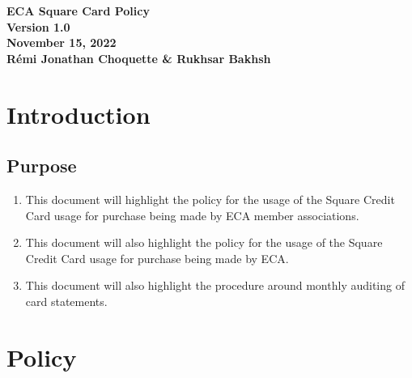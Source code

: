 \documentclass[11pt]{article}
\begin{document}

    \begin{center}
        \textbf{\LARGE{ECA Square Card Policy}}\\
        \textbf{\large{Version 1.0}}\\
        \textbf{\large{November 15, 2022}}\\
        \textbf{\large{Rémi Jonathan Choquette & Rukhsar Bakhsh}}\\
    \end{center}


    \section{Introduction}

    \subsection{Purpose}
    \begin{enumerate}
        \begin{enumerate}
            \item This document will highlight the policy for the usage of the Square Credit Card usage for purchase being made by ECA
            member associations.
            \item This document will also highlight the policy for the usage of the Square Credit Card usage for purchase being made by ECA.
            \item This document will also highlight the procedure around monthly auditing of card statements.
        \end{enumerate}
    \end{enumerate}



    \section{Policy}\label{sec:policy}
\end{document}
